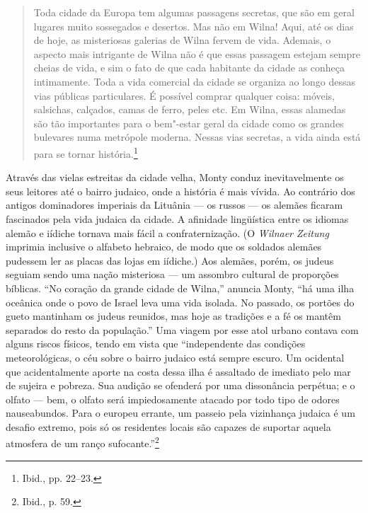 %

\begin{quote}
Toda cidade da Europa tem algumas passagens secretas, que são em geral
lugares muito sossegados e desertos. Mas não em Wilna! Aqui, até os dias
de hoje, as misteriosas galerias de Wilna fervem de vida. Ademais, o
aspecto mais intrigante de Wilna não é que essas passagem estejam sempre
cheias de vida, e sim o fato de que cada habitante da cidade as conheça
intimamente. Toda a vida comercial da cidade se organiza ao longo dessas
vias públicas particulares. É possível comprar qualquer coisa: móveis,
salsichas, calçados, camas de ferro, peles etc. Em Wilna, essas alamedas
são tão importantes para o bem"-estar geral da cidade como os grandes
bulevares numa metrópole moderna. Nessas vias secretas, a vida ainda
está para se tornar história.\footnote{Ibid., pp. 22--23.}
\end{quote}

Através das vielas estreitas da cidade velha, Monty conduz
inevitavelmente os seus leitores até o bairro judaico, onde a história é
mais vívida. Ao contrário dos antigos dominadores imperiais da Lituânia
--- os russos --- os alemães ficaram fascinados pela vida judaica da cidade.
A afinidade lingüística entre os idiomas alemão e iídiche tornava mais
fácil a confraternização. (O \emph{Wilnaer Zeitung} imprimia inclusive o
alfabeto hebraico, de modo que os soldados alemães pudessem ler as
placas das lojas em iídiche.) Aos alemães, porém, os judeus seguiam
sendo uma nação misteriosa --- um assombro cultural de proporções
bíblicas. ``No coração da grande cidade de Wilna,'' anuncia Monty, ``há
uma ilha oceânica onde o povo de Israel leva uma vida isolada. No
passado, os portões do gueto mantinham os judeus reunidos, mas hoje as
tradições e a fé os mantêm separados do resto da população.'' Uma viagem
por esse atol urbano contava com alguns riscos físicos, tendo em vista
que ``independente das condições meteorológicas, o céu sobre o bairro
judaico está sempre escuro. Um ocidental que acidentalmente aporte na
costa dessa ilha é assaltado de imediato pelo mar de sujeira e pobreza.
Sua audição se ofenderá por uma dissonância perpétua; e o olfato --- bem,
o olfato será impiedosamente atacado por todo tipo de odores
nauseabundos. Para o europeu errante, um passeio pela vizinhança judaica
é um desafio extremo, pois só os residentes locais são capazes de
suportar aquela atmosfera de um ranço sufocante.''\footnote{Ibid., p.
  59.}

